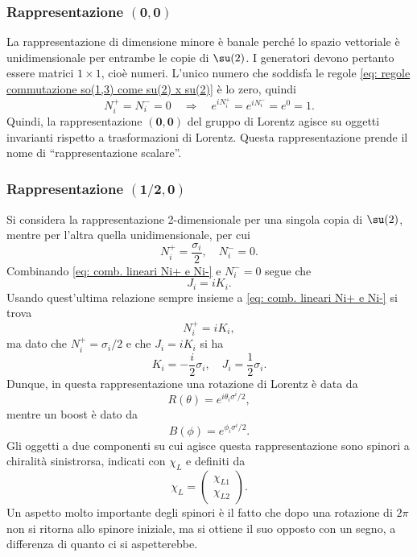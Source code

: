 \subsubsection{Rappresentazione \texorpdfstring{$\bm{(0,0)}$}{(0,0)}}
La rappresentazione di dimensione minore è banale perché lo spazio vettoriale è unidimensionale per entrambe le copie di $\su(2)$. I generatori devono pertanto essere matrici $1 \times 1$, cioè numeri. L'unico numero che soddisfa le regole \eqref{eq: regole commutazione so(1,3) come su(2) x su(2)} è lo zero, quindi
\begin{equation}
    N_i^+ = N_i ^- = 0\quad\Rightarrow\quad e^{iN_i^+} = e^{iN_i^-} = e^0 = 1.
\end{equation}
Quindi, la rappresentazione $\bm{(0,0)}$ del gruppo di Lorentz agisce su oggetti invarianti rispetto a trasformazioni di Lorentz. Questa rappresentazione prende il nome di ``rappresentazione scalare''.

\subsubsection{Rappresentazione \texorpdfstring{$\bm{(1/2,0)}$}{(1/2,0)}}
Si considera la rappresentazione 2-dimensionale per una singola copia di $\su(2)$, mentre per l'altra quella unidimensionale, per cui 
\begin{equation}
    N_i^+ = \frac{\sigma_i}{2},\quad N_i^- = 0.
\end{equation}
Combinando \eqref{eq: comb. lineari Ni+ e Ni-} e $N_i^- = 0$ segue che 
\begin{equation}
    J_i = iK_i.
\end{equation}
Usando quest'ultima relazione sempre insieme a \eqref{eq: comb. lineari Ni+ e Ni-} si trova
\begin{equation}
    N_i^+ = iK_i,
\end{equation}
ma dato che $N_i^+ = \sigma_i/2$ e che $J_i = iK_i$ si ha
\begin{equation}
    K_i = -\frac{i}{2}\sigma_i,\quad J_i=\frac{1}{2}\sigma_i.
\end{equation}
Dunque, in questa rappresentazione una rotazione di Lorentz è data da
\begin{equation}
    R(\theta) = e^{i\theta_i\sigma^i/2},
\end{equation}
mentre un boost è dato da
\begin{equation}
    B(\phi) = e^{\phi_i\sigma^i/2}.
\end{equation}
Gli oggetti a due componenti su cui agisce questa rappresentazione sono spinori a chiralità sinistrorsa, indicati con $\chi_L$ e definiti da
\begin{equation}
    \chi_L = 
    \begin{pmatrix}
        \chi_{L1} \\
        \chi_{L2}
    \end{pmatrix}.
\end{equation}
Un aspetto molto importante degli spinori è il fatto che dopo una rotazione di $2\pi$ non si ritorna allo spinore iniziale, ma si ottiene il suo opposto con un segno, a differenza di quanto ci si aspetterebbe.

